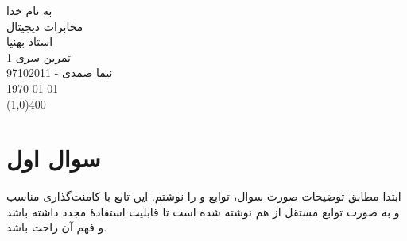 \documentclass[a4paper]{article}
\begin{document}
\begin{center}
\begin{bf}
\huge{به نام خدا} \\
\vspace*{3mm}
\large{مخابرات دیجیتال}\\
\vspace*{1.5mm}
\large{استاد بهنیا} \\
\vspace*{1.5mm}
\large{تمرین سری  1} \\
\vspace*{1.5mm}
\large{نیما صمدی - 97102011} \\
\vspace*{1.5mm}
\today \\
\vspace*{1.5mm}
\line(1,0){400}
\vspace*{5mm}
\end{bf}
\end{center}
\section{سوال اول}
ابتدا مطابق توضیحات صورت سوال، توابع 
و
را نوشتم. این تابع با کامنت‌گذاری مناسب و به صورت توابع مستقل از هم نوشته شده است تا قابلیت استفادۀ مجدد داشته باشد و فهم آن راحت باشد. 
\end{document}
